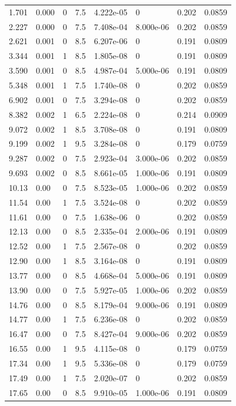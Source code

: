 \documentclass[preview]{standalone}
\begin{document}
{{\begin{tabular}{L{1.2cm}C{1.2cm} C{0.3cm}C{0.5cm} C{1.4cm}C{1.4cm} C{1.4cm}C{1.4cm}}
  1.701  &  0.000  & 0     & 7.5 &  4.222e-05  & 0  & 0.202 &  0.0859   \\ 
  2.227  &  0.000  & 0     & 7.5 &  7.408e-04  & 8.000e-06  & 0.202 &  0.0859   \\ 
  2.621  &  0.001  & 0     & 8.5 &  6.207e-06  & 0  & 0.191 &  0.0809   \\ 
  3.344  &  0.001  & 1     & 8.5 &  1.805e-08  & 0  & 0.191 &  0.0809   \\ 
  3.590  &  0.001  & 0     & 8.5 &  4.987e-04  & 5.000e-06  & 0.191 &  0.0809   \\ 
  5.348  &  0.001  & 1     & 7.5 &  1.740e-08  & 0  & 0.202 &  0.0859   \\ 
  6.902  &  0.001  & 0     & 7.5 &  3.294e-08  & 0  & 0.202 &  0.0859   \\ 
  8.382  &  0.002  & 1     & 6.5 &  2.224e-08  & 0  & 0.214 &  0.0909   \\ 
  9.072  &  0.002  & 1     & 8.5 &  3.708e-08  & 0  & 0.191 &  0.0809   \\ 
  9.199  &  0.002  & 1     & 9.5 &  3.284e-08  & 0  & 0.179 &  0.0759   \\ 
  9.287  &  0.002  & 0     & 7.5 &  2.923e-04  & 3.000e-06  & 0.202 &  0.0859   \\ 
  9.693  &  0.002  & 0     & 8.5 &  8.661e-05  & 1.000e-06  & 0.191 &  0.0809   \\ 
  10.13  &  0.00  & 0     & 7.5 &  8.523e-05  & 1.000e-06  & 0.202 &  0.0859   \\ 
  11.54  &  0.00  & 1     & 7.5 &  3.524e-08  & 0  & 0.202 &  0.0859   \\ 
  11.61  &  0.00  & 0     & 7.5 &  1.638e-06  & 0  & 0.202 &  0.0859   \\ 
  12.13  &  0.00  & 0     & 8.5 &  2.335e-04  & 2.000e-06  & 0.191 &  0.0809   \\ 
  12.52  &  0.00  & 1     & 7.5 &  2.567e-08  & 0  & 0.202 &  0.0859   \\ 
  12.90  &  0.00  & 1     & 8.5 &  3.164e-08  & 0  & 0.191 &  0.0809   \\ 
  13.77  &  0.00  & 0     & 8.5 &  4.668e-04  & 5.000e-06  & 0.191 &  0.0809   \\ 
  13.90  &  0.00  & 0     & 7.5 &  5.927e-05  & 1.000e-06  & 0.202 &  0.0859   \\ 
  14.76  &  0.00  & 0     & 8.5 &  8.179e-04  & 9.000e-06  & 0.191 &  0.0809   \\ 
  14.77  &  0.00  & 1     & 7.5 &  6.236e-08  & 0  & 0.202 &  0.0859   \\ 
  16.47  &  0.00  & 0     & 7.5 &  8.427e-04  & 9.000e-06  & 0.202 &  0.0859   \\ 
  16.55  &  0.00  & 1     & 9.5 &  4.115e-08  & 0  & 0.179 &  0.0759   \\ 
  17.34  &  0.00  & 1     & 9.5 &  5.336e-08  & 0  & 0.179 &  0.0759   \\ 
  17.49  &  0.00  & 1     & 7.5 &  2.020e-07  & 0  & 0.202 &  0.0859   \\ 
  17.65  &  0.00  & 0     & 8.5 &  9.910e-05  & 1.000e-06  & 0.191 &  0.0809   \\ 
\hline 
\end{tabular} 

}}
\end{document}
